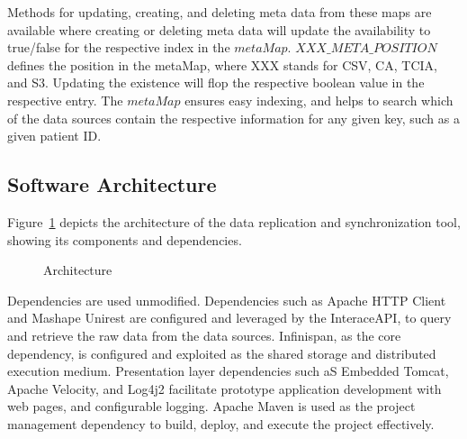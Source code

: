 \documentclass[conference]{IEEEtran}
\begin{document}
Methods for updating, creating, and deleting meta data from these maps are available where creating or deleting meta data will update the availability to true/false for the respective index in the $metaMap$. $XXX\_META\_POSITION$ defines the position in the metaMap, where XXX stands for CSV, CA, TCIA, and S3. Updating the existence will flop the respective boolean value in the respective entry. The $metaMap$ ensures easy indexing, and helps to search which of the data sources contain the respective information for any given key, such as a given patient ID.


\subsection{Software Architecture}
Figure~\ref{fig:arch} depicts the architecture of the data replication and synchronization tool, showing its components and dependencies.
\begin{figure}[!htbp]
\begin{center}
\end{center}
 \caption{Architecture}
 \label{fig:arch}
\end{figure}

Dependencies are used unmodified. Dependencies such as Apache HTTP Client and Mashape Unirest are configured and leveraged by the InteraceAPI, to query and retrieve the raw data from the data sources. Infinispan, as the core dependency, is configured and exploited as the shared storage and distributed execution medium. Presentation layer dependencies such aS Embedded Tomcat, Apache Velocity, and Log4j2 facilitate prototype application development with web pages, and configurable logging. Apache Maven is used as the project management dependency to build, deploy, and execute the project effectively.
\end{document}
